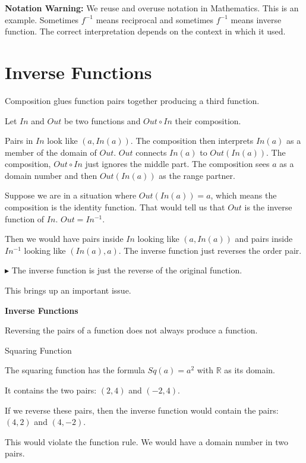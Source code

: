 \documentclass{ximera}
\begin{document}
\textbf{Notation Warning:} We reuse and overuse notation in Mathematics.  This is an example.  Sometimes $f^{-1}$ means reciprocal and sometimes $f^{-1}$ means inverse function.  The correct interpretation depends on the context in which it used.













\section*{Inverse Functions}




Composition glues function pairs together producing a third function.

Let $In$ and $Out$ be two functions and $Out \circ In$ their composition.


Pairs in $In$ look like $(a, In(a))$.   The composition then interprets $In(a)$ as a member of the domain of $Out$.  $Out$ connects $In(a)$ to $Out(In(a))$.   The composition, $Out \circ In$ just ignores the middle part.  The composition sees $a$ as a domain number and then $Out(In(a))$ as the range partner.


Suppose we are in a situation where $Out(In(a)) = a$, which means the composition is the identity function.  That would tell us that $Out$ is the inverse function of $In$.  $Out = In^{-1}$.

Then we would have pairs inside $In$ looking like $(a, In(a))$ and pairs inside $In^{-1}$ looking like $(In(a), a)$.  The inverse function just reverses the order pair. 


\textbf{\textcolor{blue!75!black}{$\blacktriangleright$}}  The inverse function is just the reverse of the original function. 


This brings up an important issue.


\begin{warning} \textbf{\textcolor{red!70!black}{Inverse Functions}} 

Reversing the pairs of a function does not always produce a function.


\end{warning}




\begin{example} Squaring Function


The squaring function has the formula $Sq(a) =a^2$ with \textbf{$\mathbb{R}$} as its domain.

It contains the two pairs: $(2, 4)$ and $(-2, 4)$.



If we reverse these pairs, then the inverse function would contain the pairs: $(4, 2)$ and $(4,-2)$.

This would violate the function rule.  We would have a domain number in two pairs.

\end{example}
\end{document}
